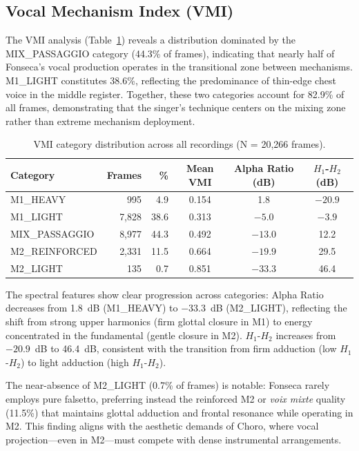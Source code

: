 \documentclass[review,3p,number]{elsarticle}
\begin{document}
\subsection{Vocal Mechanism Index (VMI)}
\label{sec:vmi_results}

The VMI analysis (Table~\ref{tab:vmi}) reveals a distribution dominated by the
MIX\_PASSAGGIO category (44.3\% of frames), indicating that nearly half of Fonseca's
vocal production operates in the transitional zone between mechanisms. M1\_LIGHT
constitutes 38.6\%, reflecting the predominance of thin-edge chest voice in the
middle register. Together, these two categories account for 82.9\% of all frames,
demonstrating that the singer's technique centers on the mixing zone rather than
extreme mechanism deployment.

\begin{table}[htbp]
\centering
\caption{VMI category distribution across all recordings (N = 20,266 frames).}
\label{tab:vmi}
\begin{tabular}{@{}lrrccc@{}}
\toprule
\textbf{Category} & \textbf{Frames} & \textbf{\%} & \textbf{Mean VMI}
  & \textbf{Alpha Ratio (dB)} & \textbf{$H_1$-$H_2$ (dB)} \\
\midrule
M1\_HEAVY       & 995   & 4.9  & 0.154 & 1.8   & $-20.9$ \\
M1\_LIGHT       & 7,828 & 38.6 & 0.313 & $-5.0$  & $-3.9$  \\
MIX\_PASSAGGIO  & 8,977 & 44.3 & 0.492 & $-13.0$ & 12.2    \\
M2\_REINFORCED  & 2,331 & 11.5 & 0.664 & $-19.9$ & 29.5    \\
M2\_LIGHT       & 135   & 0.7  & 0.851 & $-33.3$ & 46.4    \\
\bottomrule
\end{tabular}
\end{table}

The spectral features show clear progression across categories: Alpha Ratio
decreases from 1.8~dB (M1\_HEAVY) to $-33.3$~dB (M2\_LIGHT), reflecting the shift
from strong upper harmonics (firm glottal closure in M1) to energy concentrated in
the fundamental (gentle closure in M2). $H_1$-$H_2$ increases from $-20.9$~dB to
46.4~dB, consistent with the transition from firm adduction (low $H_1$-$H_2$) to light
adduction (high $H_1$-$H_2$).

The near-absence of M2\_LIGHT (0.7\% of frames) is notable: Fonseca rarely employs
pure falsetto, preferring instead the reinforced M2 or \emph{voix mixte} quality
(11.5\%) that maintains glottal adduction and frontal resonance while operating in
M2. This finding aligns with the aesthetic demands of Choro, where vocal
projection---even in M2---must compete with dense instrumental arrangements.
\end{document}
